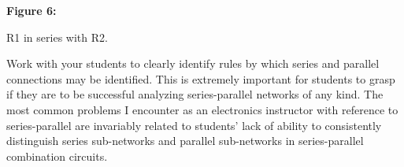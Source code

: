 \vskip 10pt

\noindent
{\bf Figure 6:}

R1 in series with R2.







Work with your students to clearly identify rules by which series and parallel connections may be identified.  This is extremely important for students to grasp if they are to be successful analyzing series-parallel networks of any kind.  The most common problems I encounter as an electronics instructor with reference to series-parallel are invariably related to students' lack of ability to consistently distinguish series sub-networks and parallel sub-networks in series-parallel combination circuits.




